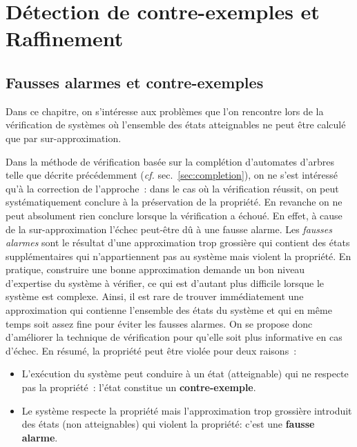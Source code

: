\chapter{Détection de contre-exemples et Raffinement}
\section{Fausses alarmes et contre-exemples}


Dans ce chapitre, on s'intéresse aux problèmes que l'on rencontre lors de la vérification de systèmes
où l'ensemble des états atteignables ne peut être calculé que par sur-approximation.

Dans la méthode de vérification basée sur la complétion d'automates d'arbres telle que décrite précédemment
(\textit{cf.} sec.~\ref{sec:completion}), on ne s'est intéressé qu'à la correction de l'approche~:
dans le cas où la vérification réussit, on peut systématiquement  conclure à la préservation
de la propriété. En revanche on ne peut absolument rien conclure lorsque la vérification a échoué.
En effet, à cause de la sur-approximation l'échec peut-être dû à une fausse alarme. Les \emph{fausses alarmes} sont
le résultat d'une approximation trop grossière qui contient des états supplémentaires qui n'appartiennent pas au 
système mais violent la propriété. %
En pratique, construire une \og bonne \fg approximation demande un bon niveau d'expertise du système à vérifier, 
ce qui est d'autant plus difficile lorsque le système est complexe. 
Ainsi, il est rare de trouver immédiatement une approximation qui contienne l'ensemble des états du système et qui en
même temps soit assez fine pour éviter les fausses alarmes. On se propose donc d'améliorer la technique de vérification
pour qu'elle soit plus informative en cas d'échec. En résumé, la propriété peut être violée pour deux raisons~:\\

\begin{itemize}
\item L'exécution du système peut conduire à un état (atteignable) qui ne
  respecte pas la propriété~: l'état constitue un \textbf{contre-exemple}.
  
\item Le système respecte la propriété mais l'approximation trop
  grossière introduit des états (non atteignables) qui violent la
  propriété: c'est une \textbf{fausse alarme}.\\
\end{itemize}


